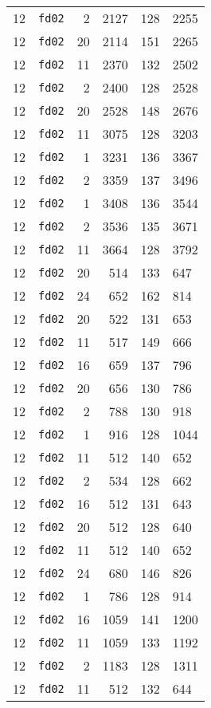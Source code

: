 \documentclass{article}
\begin{document}
\begin{table}[h!]
\begin{tabular}{llrrrl}
    12 & \texttt{fd02} & 2 & 2127 & 128 & 2255 \\
    12 & \texttt{fd02} & 20 & 2114 & 151 & 2265 \\
    12 & \texttt{fd02} & 11 & 2370 & 132 & 2502 \\
    12 & \texttt{fd02} & 2 & 2400 & 128 & 2528 \\
    12 & \texttt{fd02} & 20 & 2528 & 148 & 2676 \\
    12 & \texttt{fd02} & 11 & 3075 & 128 & 3203 \\
    12 & \texttt{fd02} & 1 & 3231 & 136 & 3367 \\
    12 & \texttt{fd02} & 2 & 3359 & 137 & 3496 \\
    12 & \texttt{fd02} & 1 & 3408 & 136 & 3544 \\
    12 & \texttt{fd02} & 2 & 3536 & 135 & 3671 \\
    12 & \texttt{fd02} & 11 & 3664 & 128 & 3792 \\
    12 & \texttt{fd02} & 20 & 514 & 133 & 647 \\
    12 & \texttt{fd02} & 24 & 652 & 162 & 814 \\
    12 & \texttt{fd02} & 20 & 522 & 131 & 653 \\
    12 & \texttt{fd02} & 11 & 517 & 149 & 666 \\
    12 & \texttt{fd02} & 16 & 659 & 137 & 796 \\
    12 & \texttt{fd02} & 20 & 656 & 130 & 786 \\
    12 & \texttt{fd02} & 2 & 788 & 130 & 918 \\
    12 & \texttt{fd02} & 1 & 916 & 128 & 1044 \\
    12 & \texttt{fd02} & 11 & 512 & 140 & 652 \\
    12 & \texttt{fd02} & 2 & 534 & 128 & 662 \\
    12 & \texttt{fd02} & 16 & 512 & 131 & 643 \\
    12 & \texttt{fd02} & 20 & 512 & 128 & 640 \\
    12 & \texttt{fd02} & 11 & 512 & 140 & 652 \\
    12 & \texttt{fd02} & 24 & 680 & 146 & 826 \\
    12 & \texttt{fd02} & 1 & 786 & 128 & 914 \\
    12 & \texttt{fd02} & 16 & 1059 & 141 & 1200 \\
    12 & \texttt{fd02} & 11 & 1059 & 133 & 1192 \\
    12 & \texttt{fd02} & 2 & 1183 & 128 & 1311 \\
    12 & \texttt{fd02} & 11 & 512 & 132 & 644 \\

\end{tabular}
\end{table}
\end{document}
